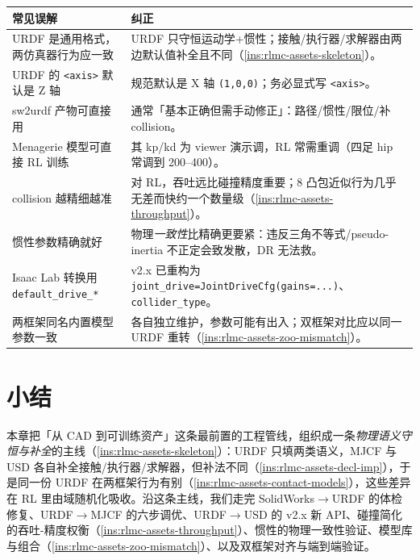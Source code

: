 \begin{center}
\small
\begin{tabular}{@{}p{5.2cm}p{8.6cm}@{}}
\toprule
常见误解 & 纠正 \\
\midrule
URDF 是通用格式，两仿真器行为应一致 & URDF 只守恒运动学+惯性；接触/执行器/求解器由两边默认值补全且不同（\cref{ins:rlmc-assets-skeleton}）。 \\
URDF 的 \texttt{<axis>} 默认是 Z 轴 & 规范默认是 X 轴 \texttt{(1,0,0)}；务必显式写 \texttt{<axis>}。 \\
sw2urdf 产物可直接用 & 通常「基本正确但需手动修正」：路径/惯性/限位/补 collision。 \\
Menagerie 模型可直接 RL 训练 & 其 kp/kd 为 viewer 演示调，RL 常需重调（四足 hip 常调到 200--400）。 \\
collision 越精细越准 & 对 RL，吞吐远比碰撞精度重要；8 凸包近似行为几乎无差而快约一个数量级（\cref{ins:rlmc-assets-throughput}）。 \\
惯性参数精确就好 & 物理\emph{一致性}比精确更要紧：违反三角不等式/pseudo-inertia 不正定会致发散，DR 无法救。 \\
Isaac Lab 转换用 \texttt{default\_drive\_*} & v2.x 已重构为 \texttt{joint\_drive=JointDriveCfg(gains=...)}、\texttt{collider\_type}。 \\
两框架同名内置模型参数一致 & 各自独立维护，参数可能有出入；双框架对比应以同一 URDF 重转（\cref{ins:rlmc-assets-zoo-mismatch}）。 \\
\bottomrule
\end{tabular}
\end{center}

\section*{小结}
\label{sec:rlmc-assets-summary}

本章把「从 CAD 到可训练资产」这条最前置的工程管线，组织成一条\emph{物理语义守恒与补全}的主线（\cref{ins:rlmc-assets-skeleton}）：URDF 只填两类语义，MJCF 与 USD 各自补全接触/执行器/求解器，但补法不同（\cref{ins:rlmc-assets-decl-imp}），于是同一份 URDF 在两框架行为有别（\cref{ins:rlmc-assets-contact-models}），这些差异在 RL 里由域随机化吸收。沿这条主线，我们走完 SolidWorks$\to$URDF 的体检修复、URDF$\to$MJCF 的六步调优、URDF$\to$USD 的 v2.x 新 API、碰撞简化的吞吐-精度权衡（\cref{ins:rlmc-assets-throughput}）、惯性的物理一致性验证、模型库与组合（\cref{ins:rlmc-assets-zoo-mismatch}）、以及双框架对齐与端到端验证。

